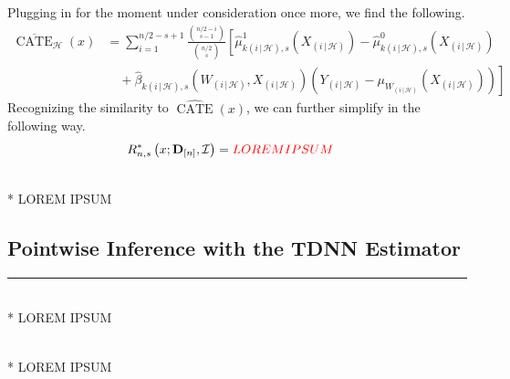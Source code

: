 Plugging in for the moment under consideration once more, we find the following.
\begin{equation}
	\begin{aligned}
		\overline{\operatorname{CATE}}_{\mathcal{H}}\left(x\right) 
		& = \sum_{i = 1}^{n/2 - s + 1} \frac{\binom{n/2-i}{s-1}}{\binom{n/2}{s}} 
		\left[\hat{\mu}_{k(i \, | \, \mathcal{H}),s}^{1}\left(X_{(i \, | \, \mathcal{H})}\right) 
		- \hat{\mu}_{k(i \, | \, \mathcal{H}),s}^{0}\left(X_{(i \, | \, \mathcal{H})}\right) \right.\\
		& \left. \quad + \hat{\beta}_{k(i \, | \, \mathcal{H}),s}\left(W_{(i \, | \, \mathcal{H})}, X_{(i \, | \, \mathcal{H})}\right)\left(Y_{(i \, | \, \mathcal{H})} - \mu_{W_{(i \, | \, \mathcal{H})}}\left(X_{(i \, | \, \mathcal{H})}\right)\right)\right]
	\end{aligned}
\end{equation}
Recognizing the similarity to $\widehat{\operatorname{CATE}}\left(x\right)$, we can further simplify in the following way.
\begin{equation}
	\begin{aligned}
		R^{*}_{n,s}\left(x; \mathbf{D}_{[n]}, \mathcal{I}\right)
		& = {\color{red} LOREM IPSUM}
	\end{aligned}
\end{equation}

\begin{boxD}
	\begin{thm}\label{thm:CATE_DNN_DML_Var_Est}\mbox{}\\*
		{\color{red} LOREM IPSUM}
	\end{thm}
\end{boxD}

\subsection{Pointwise Inference with the TDNN Estimator}
\hrule
\begin{boxD}
	\begin{thm}\label{thm:pw_inf_TDNN}\mbox{}\\*
		{\color{red} LOREM IPSUM}
	\end{thm}
\end{boxD}

\begin{boxD}
	\begin{thm}\label{thm:pw_inf_TDNN_HTE}\mbox{}\\*
		{\color{red} LOREM IPSUM}
	\end{thm}
\end{boxD}
